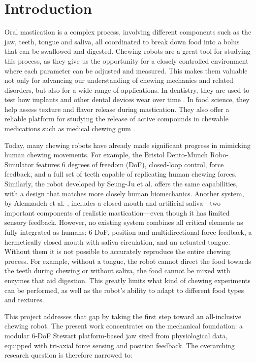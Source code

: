 \section{Introduction}

Oral mastication is a complex process, involving different components such as the jaw, teeth, tongue and saliva, all coordinated to break down food into 
a bolus that can be swallowed and digested. Chewing robots are a great tool for studying this process, as they give us the opportunity for a closely controlled environment where each parameter can be adjusted and measured. This makes them valuable not only for advancing our understanding of chewing mechanics and related disorders, but also for a wide range of applications. In dentistry, they are used to test how implants and other dental devices wear over time \cite{dental_application}. In food science, they help assess texture \cite{foodscience} and flavor release during mastication. They also offer a reliable platform for studying the release of active compounds in chewable medications such as medical chewing gum \cite{ChewingRobotGums}.

Today, many chewing robots have already made significant progress in mimicking human chewing movements.
For example, the Bristol Dento-Munch Robo-Simulator \cite{BristolChewingRobot} features 6 degrees of freedom 
(DoF), closed-loop control, force feedback, and a full set of teeth capable of replicating human chewing forces. Similarly, the robot developed by Seung-Ju 
et al. \cite{ChewingRobotLinearActuator} offers the same capabilities, with a design that matches more closely human biomechanics. Another system, by Alemzadeh 
et al. \cite{ChewingRobotGums}, includes a closed mouth and artificial saliva—two important components of realistic mastication—even though it has limited 
sensory feedback. However, no existing system combines all critical elements as fully integrated as humans: 6-DoF, position and multidirectional force feedback, a hermetically closed 
mouth with saliva circulation, and an actuated tongue. Without them it is not possible to accurately reproduce the entire chewing process. For example, without 
a tongue, the robot cannot direct the food towards the teeth during chewing or without saliva, the food cannot be mixed with enzymes that aid digestion. This greatly 
limits what kind of chewing experiments can be performed, as well as the robot's ability to adapt to different food types and textures.

This project addresses that gap by taking the first step toward an all-inclusive chewing robot. The present work concentrates on the mechanical foundation: a modular 6-DoF Stewart platform-based jaw sized from physiological data, equipped with tri-axial force sensing and position feedback. The overarching research question is therefore narrowed to:


